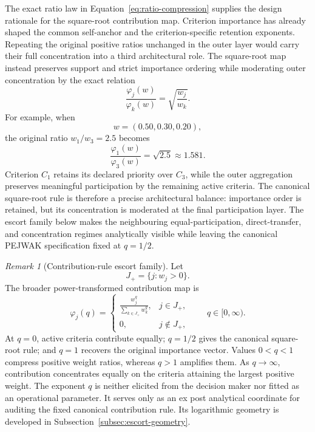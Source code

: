 \documentclass[reqno,11pt]{amsart}
\theoremstyle{definition}
\theoremstyle{plain}
\theoremstyle{remark}
\newtheorem{remark}{Remark}
\begin{document}
The exact ratio law in
Equation~\eqref{eq:ratio-compression} supplies the design rationale for
the square-root contribution map. Criterion importance has already shaped
the common self-anchor and the criterion-specific retention exponents.
Repeating the original positive ratios unchanged in the outer layer would
carry their full concentration into a third architectural role. The
square-root map instead preserves support and strict importance ordering
while moderating outer concentration by the exact relation
\[
\frac{\varphi_j(w)}{\varphi_k(w)}
=
\sqrt{\frac{w_j}{w_k}}.
\]
For example, when
\[
w=(0.50,0.30,0.20),
\]
the original ratio \(w_1/w_3=2.5\) becomes
\[
\frac{\varphi_1(w)}{\varphi_3(w)}
=
\sqrt{2.5}
\approx1.581.
\]
Criterion \(C_1\) retains its declared priority over \(C_3\), while the
outer aggregation preserves meaningful participation by the remaining
active criteria. The canonical square-root rule is therefore a precise
architectural balance: importance order is retained, but its
concentration is moderated at the final participation layer. The escort
family below makes the neighbouring equal-participation, direct-transfer,
and concentration regimes analytically visible while leaving the
canonical PEJWAK specification fixed at \(q=1/2\).

\begin{remark}[Contribution-rule escort family]
Let
\[
J_+=\{j:w_j>0\}.
\]
The broader power-transformed contribution map is
\begin{equation*}
\varphi_j(q)
=
\begin{cases}
\displaystyle
\frac{w_j^q}
{\sum_{k\in J_+}w_k^q},
& j\in J_+,\\[3mm]
0,
& j\notin J_+,
\end{cases}
\qquad
q\in[0,\infty).
\end{equation*}
At $q=0$, active criteria contribute equally; $q=1/2$ gives the canonical square-root rule; and $q=1$ recovers the original importance vector. Values $0<q<1$ compress positive weight ratios, whereas $q>1$ amplifies them. As $q\to\infty$, contribution concentrates equally on the criteria attaining the largest positive weight. The exponent $q$ is neither elicited from the decision maker nor fitted as an operational parameter. It serves only as an ex post analytical coordinate for auditing the fixed canonical contribution rule. Its logarithmic geometry is developed in Subsection~\ref{subsec:escort-geometry}.
\end{remark}

\end{document}
